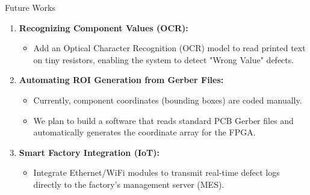 \documentclass[t, aspectratio=169]{beamer}
\begin{document}
    \begin{frame}{Future Works}
		\begin{enumerate}
            \item \textbf{Recognizing Component Values (OCR):} 
            \begin{itemize}
                \item Add an Optical Character Recognition (OCR) model to read printed text on tiny resistors, enabling the system to detect "Wrong Value" defects.
            \end{itemize}
            
            \vspace{0.8em}
            \item \textbf{Automating ROI Generation from Gerber Files:} 
            \begin{itemize}
                \item Currently, component coordinates (bounding boxes) are coded manually.
                \item We plan to build a software that reads standard PCB Gerber files and automatically generates the coordinate array for the FPGA.
            \end{itemize}
            
            \vspace{0.8em}
            \item \textbf{Smart Factory Integration (IoT):} 
            \begin{itemize}
                \item Integrate Ethernet/WiFi modules to transmit real-time defect logs directly to the factory's management server (MES).
            \end{itemize}
        \end{enumerate}
	\end{frame}

	\hustthankyou
	
\end{document}
